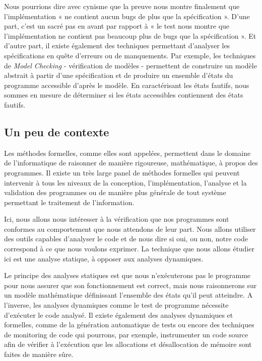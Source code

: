 \documentclass[12pt,francais,]{scrbook}
\begin{document}
Nous pourrions dire avec cynisme que la preuve nous montre finalement
que l'implémentation « ne contient aucun bugs de plus que la
spécification ». D'une part, c'est un sacré pas en avant par rapport à «
le test nous montre que l'implémentation ne contient pas beaucoup plus
de bugs que la spécification ». Et d'autre part, il existe également des
techniques permettant d'analyser les spécifications en quête d'erreurs
ou de manquements. Par exemple, les techniques de \emph{Model Checking}
- vérification de modèles - permettent de construire un modèle abstrait
à partir d'une spécification et de produire un ensemble d'états du
programme accessible d'après le modèle. En caractérisant les états
fautifs, nous sommes en mesure de déterminer si les états accessibles
contiennent des états fautifs.

\subsection{Un peu de contexte}\label{un-peu-de-contexte}

Les méthodes formelles, comme elles sont appelées, permettent dans le
domaine de l'informatique de raisonner de manière rigoureuse,
mathématique, à propos des programmes. Il existe un très large panel de
méthodes formelles qui peuvent intervenir à tous les niveaux de la
conception, l'implémentation, l'analyse et la validation des programmes
ou de manière plus générale de tout système permettant le traitement de
l'information.

Ici, nous allons nous intéresser à la vérification que nos programmes
sont conformes au comportement que nous attendons de leur part. Nous
allons utiliser des outils capables d'analyser le code et de nous dire
si oui, ou non, notre code correspond à ce que nous voulons exprimer. La
technique que nous allons étudier ici est une analyse statique, à
opposer aux analyses dynamiques.

Le principe des analyses statiques est que nous n'exécuterons pas le
programme pour nous assurer que son fonctionnement est correct, mais
nous raisonnerons sur un modèle mathématique définissant l'ensemble des
états qu'il peut atteindre. A l'inverse, les analyses dynamiques comme
le test de programme nécessite d'exécuter le code analysé. Il existe
également des analyses dynamiques et formelles, comme de la génération
automatique de tests ou encore des techniques de monitoring de code qui
pourrons, par exemple, instrumenter un code source afin de vérifier à
l'exécution que les allocations et désallocation de mémoire sont faites
de manière sûre.
\end{document}
